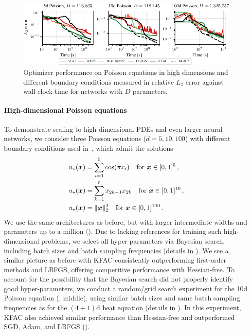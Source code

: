 \begin{figure}
  \centering
  \includegraphics{kfac_pinns_exp/exp33_poisson_bayes_groupplot/l2_error_over_time.pdf}
  \caption{
    Optimizer performance on Poisson equations in high dimensions and different boundary conditions measured in relative $L_2$ error against wall clock time for networks with $D$ parameters.
  }
  \label{fig:10D-Poisson}
\end{figure}

\paragraph{High-dimensional Poisson equations}
To demonstrate scaling to high-dimensional PDEs and even larger neural networks, we consider three Poisson equations ($d=5,10,100$) with different boundary conditions used in~\cite{yu2018deep, muller2023achieving}, which admit the solutions
\begin{align}\label{eq:solutions_poisson}
  \begin{split}
    u_\star({\bm{x}})
    &=
      \sum_{i=1}^5 \cos(\pi x_i) \quad \text{for } {\bm{x}}\in [0,1]^{5}\,,
    \\
    u_\star({\bm{x}})
    &=
      \sum_{k=1}^5 x_{2k-1}x_{2k}  \quad \text{for } {\bm{x}}\in [0,1]^{10}\,,
    \\
    u_\star({\bm{x}})
    &=
      \lVert {\bm{x}} \rVert_2^2 \quad \text{for } {\bm{x}}\in [0,1]^{100}\,.
  \end{split}
\end{align}
We use the same architectures as before, but with larger intermediate widths and parameters up to a million ().
Due to lacking references for training such high-dimensional problems, we select all hyper-parameters via Bayesian search, including batch sizes and batch sampling frequencies (details in ).
We see a similar picture as before with KFAC consistently outperforming first-order methods and LBFGS, offering competitive performance with Hessian-free.
To account for the possibility that the Bayesian search did not properly identify good hyper-parameters, we conduct a random/grid search experiment for the 10d Poisson equation (, middle), using similar batch sizes and same batch sampling frequencies as for the $(4+1)$d heat equation (details in ).
In this experiment, KFAC also achieved similar performance than Hessian-free and outperformed SGD, Adam, and LBFGS ().

